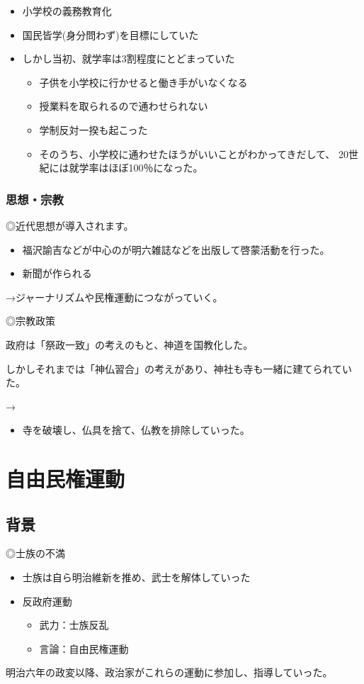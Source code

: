 \documentclass[12pt]{ltjsarticle}
\begin{document}
\begin{itemize}
\item 小学校の義務教育化
\item 国民皆学(身分問わず)を目標にしていた
\item しかし当初、就学率は3割程度にとどまっていた
\begin{itemize}
\item 子供を小学校に行かせると働き手がいなくなる
\item 授業料を取られるので通わせられない
\item 学制反対一揆も起こった
\item そのうち、小学校に通わせたほうがいいことがわかってきだして、
20世紀には就学率はほぼ100％になった。
\end{itemize}
\end{itemize}

\subsubsection{思想・宗教}
◎近代思想が導入されます。
\begin{itemize}
\item 福沢諭吉などが中心のが明六雑誌などを出版して啓蒙活動を行った。
\item 新聞が作られる
\end{itemize}
→ジャーナリズムや民権運動につながっていく。

◎宗教政策

政府は「祭政一致」の考えのもと、神道を国教化した。

しかしそれまでは「神仏習合」の考えがあり、神社も寺も一緒に建てられていた。

→
\begin{itemize}
\item {}

寺を破壊し、仏具を捨て、仏教を排除していった。
\end{itemize}

\section{自由民権運動}
\subsection{背景}
◎士族の不満
\begin{itemize}
\item 士族は自ら明治維新を推め、武士を解体していった
\item 反政府運動
\begin{itemize}
\item 武力：士族反乱
\item 言論：自由民権運動
\end{itemize}
\end{itemize}
明治六年の政変以降、政治家がこれらの運動に参加し、指導していった。
\end{document}
